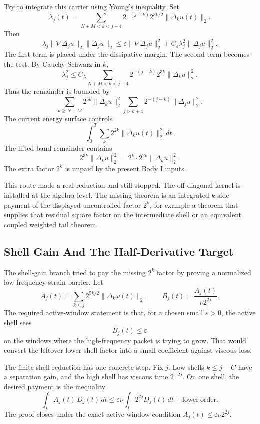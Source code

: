 Try to integrate this carrier using Young's inequality.
Set
\[
  \lambda_j(t)
  =
  \sum_{N+M<k<j-4}
  2^{-(j-k)}2^{3k/2}\|\Delta_k u(t)\|_2 .
\]
Then
\[
  \lambda_j\|\nabla\Delta_j u\|_2\|\Delta_j u\|_2
  \le
  \varepsilon\|\nabla\Delta_j u\|_2^2
  +
  C_\varepsilon\lambda_j^2\|\Delta_j u\|_2^2 .
\]
The first term is placed under the dissipative margin.
The second term becomes the test.
By Cauchy-Schwarz in \(k\),
\[
  \lambda_j^2
  \le C_\lambda
  \sum_{N+M<k<j-4}
  2^{-(j-k)}2^{3k}\|\Delta_k u\|_2^2 .
\]
Thus the remainder is bounded by
\[
  \sum_{k\ge N+M}
  2^{3k}\|\Delta_k u\|_2^2
  \sum_{j>k+4}2^{-(j-k)}\|\Delta_j u\|_2^2 .
\]
The current energy surface controls
\[
  \int_0^T\sum_k 2^{2k}\|\Delta_k u(t)\|_2^2\,dt .
\]
The lifted-band remainder contains
\[
  2^{3k}\|\Delta_k u\|_2^2
  =
  2^k\cdot 2^{2k}\|\Delta_k u\|_2^2 .
\]
The extra factor \(2^k\) is unpaid by the present Body I inputs.

This route made a real reduction and still stopped.
The off-diagonal kernel is installed at the algebra level.
The missing theorem is an integrated \(k\)-side payment of the displayed
uncontrolled factor \(2^k\), for example a theorem that supplies that residual
square factor on the intermediate shell or an equivalent coupled weighted tail
theorem.

\subsection{Shell Gain And The Half-Derivative Target}

The shell-gain branch tried to pay the missing \(2^k\) factor by proving a
normalized low-frequency strain barrier.
Let
\[
  A_j(t)=\sum_{k\le j}2^{5k/2}\|\Delta_k\omega(t)\|_2,
  \qquad
  B_j(t)=\frac{A_j(t)}{\nu 2^{2j}} .
\]
The required active-window statement is that, for a chosen small \(\varepsilon>0\), the
active shell sees
\[
  B_j(t)\le\varepsilon
\]
on the windows where the high-frequency packet is trying to grow.
That would convert the leftover lower-shell factor into a small coefficient
against viscous loss.

The finite-shell reduction has one concrete step.
Fix \(j\).
Low shells \(k\le j-C\) have a separation gain, and the high shell has viscous
time \(2^{-2j}\).
On one shell, the desired payment is the inequality
\[
  \int_I A_j(t)\,D_j(t)\,dt
  \le
  \varepsilon\nu\int_I 2^{2j}D_j(t)\,dt
  +\mathrm{lower\ order}.
\]
The proof closes under the exact active-window condition
\(A_j(t)\le\varepsilon\nu 2^{2j}\).


